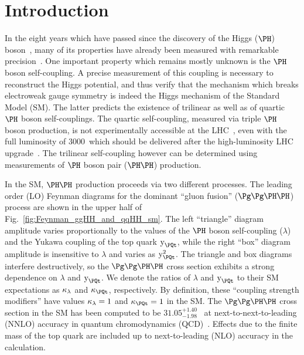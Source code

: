\section{Introduction}
\label{sec:introduction}

In the eight years which have passed since the discovery of the Higgs ($\PHiggs$) boson~\cite{Higgs-Discovery_CMS,Higgs-Discovery_CMS_long,Higgs-Discovery_ATLAS},
many of its properties have already been measured with remarkable precision~\cite{HIG-14-042,HIG-15-002,ATLAS_SpinCP,HIG-14-018,HIG-16-041}. %
One important property which remains mostly unknown is the $\PHiggs$ boson self-coupling.
A precise measurement of this coupling is necessary to reconstruct the Higgs potential,
and thus verify that the mechanism which breaks electroweak gauge symmetry is indeed the Higgs mechanism of the Standard Model (SM).
The latter predicts the existence of trilinear as well as of quartic $\PHiggs$ boson self-couplings.
The quartic self-coupling, measured via triple $\PHiggs$ boson production, is not experimentally accessible at the LHC~\cite{de_Florian_2020},
even with the full luminosity of 3000~\fbinv which should be delivered after the high-luminosity LHC upgrade~\cite{HL-LHC-TDR}.
The trilinear self-coupling however can be determined using measurements of $\PHiggs$ boson pair ($\HH$) production. %

In the SM, $\HH$ production proceeds via two different processes.
The leading order (LO) Feynman diagrams for the dominant ``gluon fusion'' ($\ggHH$) process are shown in the upper half of Fig.~\ref{fig:Feynman_ggHH_and_qqHH_sm}.
The left ``triangle'' diagram amplitude varies proportionally to the values of the $\PHiggs$ boson self-coupling ($\lambda$)
and the Yukawa coupling of the top quark $\yt$,
while the right ``box'' diagram amplitude is insensitive to $\lambda$ and varies as $\yt^{2}$.
The triangle and box diagrams interfere destructively, 
so the $\ggHH$ cross section exhibits a strong dependence on $\lambda$ and $\yt$.
We denote the ratios of $\lambda$ and $\yt$ to their SM expectations as $\kappa_{\lambda}$ and $\kappat$, respectively.
By definition, these ``coupling strength modifiers'' have values $\kappa_{\lambda} = 1$ and $\kappat = 1$ in the SM.
The $\ggHH$ cross section in the SM has been computed to be $31.05^{+1.40}_{-1.98}$~\fb
at next-to-next-to-leading (NNLO) accuracy in quantum chromodynamics (QCD)~\cite{Grazzini:2018hh}.
Effects due to the finite mass of the top quark are included up to next-to-leading (NLO) accuracy in the calculation.


